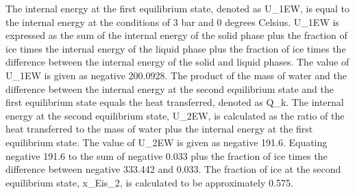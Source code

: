 The internal energy at the first equilibrium state, denoted as U_{1EW}, is equal to the internal energy at the conditions of 3 bar and 0 degrees Celsius. 
U_{1EW} is expressed as the sum of the internal energy of the solid phase plus the fraction of ice times the internal energy of the liquid phase plus the fraction of ice times the difference between the internal energy of the solid and liquid phases.
The value of U_{1EW} is given as negative 200.0928.
The product of the mass of water and the difference between the internal energy at the second equilibrium state and the first equilibrium state equals the heat transferred, denoted as Q_k.
The internal energy at the second equilibrium state, U_{2EW}, is calculated as the ratio of the heat transferred to the mass of water plus the internal energy at the first equilibrium state.
The value of U_{2EW} is given as negative 191.6.
Equating negative 191.6 to the sum of negative 0.033 plus the fraction of ice times the difference between negative 333.442 and 0.033.
The fraction of ice at the second equilibrium state, x_{Eis_2}, is calculated to be approximately 0.575.